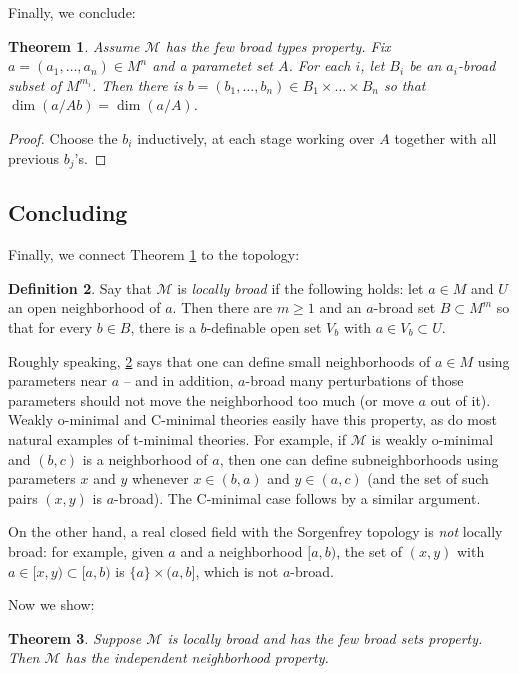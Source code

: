 \documentclass{amsart}
\newtheorem{theorem}{Theorem}[section]
\theoremstyle{definition}
\newtheorem{definition}[theorem]{Definition}
\begin{document}
Finally, we conclude:

\begin{theorem}\label{T: ind broad}
    Assume $\mathcal M$ has the few broad types property. Fix $a=(a_1,\dots,a_n)\in M^n$ and a parametet set $A$. For each $i$, let $B_i$ be an $a_i$-broad subset of $M^{m_i}$. Then there is $b=(b_1,\dots,b_n)\in B_1\times\dots\times B_n$ so that $\dim(a/Ab)=\dim(a/A)$.
\end{theorem}
\begin{proof}
    Choose the $b_i$ inductively, at each stage working over $A$ together with all previous $b_j$'s.
\end{proof}

\subsection{Concluding}

Finally, we connect Theorem \ref{T: ind broad} to the topology:

\begin{definition}\label{D: loc broad}
    Say that $\mathcal M$ is \textit{locally broad} if the following holds: let $a\in M$ and $U$ an open neighborhood of $a$. Then there are $m\geq 1$ and an $a$-broad set $B\subset M^m$ so that for every $b\in B$, there is a $b$-definable open set $V_b$ with $a\in V_b\subset U$.
\end{definition}

Roughly speaking, \ref{D: loc broad} says that one can define small neighborhoods of $a\in M$ using parameters near $a$ -- and in addition, $a$-broad many perturbations of those parameters should not move the neighborhood too much (or move $a$ out of it). Weakly o-minimal and C-minimal theories easily have this property, as do most natural examples of t-minimal theories. For example, if $\mathcal M$ is weakly o-minimal and $(b,c)$ is a neighborhood of $a$, then one can define subneighborhoods using parameters $x$ and $y$ whenever $x\in(b,a)$ and $y\in(a,c)$ (and the set of such pairs $(x,y)$ is $a$-broad). The C-minimal case follows by a similar argument.

On the other hand, a real closed field with the Sorgenfrey topology is \textit{not} locally broad: for example, given $a$ and a neighborhood $[a,b)$, the set of $(x,y)$ with $a\in[x,y)\subset[a,b)$ is $\{a\}\times(a,b]$, which is not $a$-broad.

Now we show:

\begin{theorem}\label{T: inp}
    Suppose $\mathcal M$ is locally broad and has the few broad sets property. Then $\mathcal M$ has the independent neighborhood property.
\end{theorem}
\end{document}
